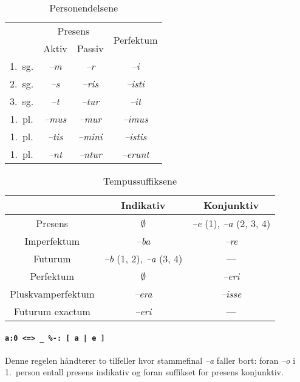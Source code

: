 \documentclass{article}
\begin{document}
\begin{table}[hp]
\begin{center}
\begin{tabular}{|c|c|c|c|}
    \hline
       & \multicolumn{2}{c|}{Presens} & \multirow{2}{*}{Perfektum} \\ \cline{2-3}
       & Aktiv & Passiv & \\
    \hline
1.~sg. & \emph{--m}   & \emph{--r}    & \emph{--i}       \\
2.~sg. & \emph{--s}   & \emph{--ris}  & \emph{--isti}    \\
3.~sg. & \emph{--t}   & \emph{--tur}  & \emph{--it}      \\
1.~pl. & \emph{--mus} & \emph{--mur}  & \emph{--imus}    \\
1.~pl. & \emph{--tis} & \emph{--mini} & \emph{--istis}   \\
1.~pl. & \emph{--nt}  & \emph{--ntur} & \emph{--erunt}   \\
    \hline
\end{tabular}
\caption{Personendelsene}
\label{endelser}
\end{center}
\end{table}

\begin{table}[hp]
\begin{center}
\begin{tabular}{|c|c|c|}
    \hline
                  & Indikativ   & Konjunktiv \\
    \hline
Presens           & $\emptyset$ & \emph{--e} (1), \emph{--a} (2, 3, 4) \\
Imperfektum       & \emph{--ba} & \emph{--re} \\
Futurum           & \emph{--b} (1, 2), \emph{--a} (3, 4) & --- \\
    \hline
Perfektum         & $\emptyset$ & \emph{--eri} \\
Pluskvamperfektum & \emph{--era} & \emph{--isse} \\
Futurum exactum   & \emph{--eri} & ---        \\
    \hline
\end{tabular}
\caption{Tempussuffiksene}
\label{tempus}
\end{center}
\end{table}

\paragraph{\texttt{a:0 <=> \_ \%-: [ a | e ]}} Denne regelen h\aa{}ndterer to
tilfeller hvor stammefinal \emph{--a} faller bort: foran \emph{--o} i
1.~person entall presens indikativ og foran suffikset for presens konjunktiv.
\end{document}
